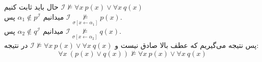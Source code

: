 \documentclass[]{exam}
\begin{document}
حال باید ثابت کنیم
$\mathscr{I} \not \models \forall x \: p(x) \lor \forall x \: q(x)$
\\
میدانیم
$\alpha_1 \notin p^\mathscr{I}$
پس 
$\mathscr{I} \underset{\sigma [x \leftarrow \alpha_1]}{\not \models} p(x)$.
\\
میدانیم
$\alpha_2 \notin q^\mathscr{I}$
پس
$\mathscr{I} \underset{\sigma [x \leftarrow \alpha_2]}{\not \models} q(x)$.
\\
پس نتیجه می‌گیریم که عطف بالا صادق نیست و 
$\mathscr{I} \not \models \forall x \: p(x) \lor \forall x \: q(x)$
در نتیجه:
$$\forall x \: ( p(x) \lor q(x) ) \not \models \forall x \: p(x) \lor \forall x  \: q(x)$$
\end{document}
